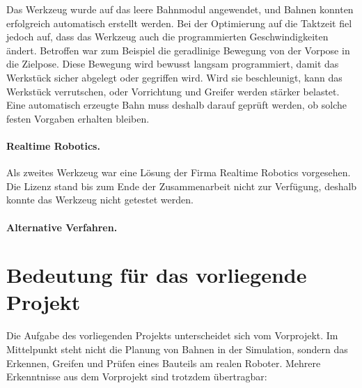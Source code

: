 Das Werkzeug wurde auf das leere Bahnmodul angewendet, und Bahnen konnten erfolgreich
automatisch erstellt werden. Bei der Optimierung auf die Taktzeit fiel jedoch auf, dass das Werkzeug auch
die programmierten Geschwindigkeiten ändert. Betroffen war zum Beispiel die geradlinige Bewegung
von der Vorpose in die Zielpose. Diese Bewegung wird bewusst langsam programmiert, damit das
Werkstück sicher abgelegt oder gegriffen wird. Wird sie beschleunigt, kann das Werkstück
verrutschen, oder Vorrichtung und Greifer werden stärker belastet. Eine automatisch erzeugte
Bahn muss deshalb darauf geprüft werden, ob solche festen Vorgaben erhalten bleiben.


\paragraph{Realtime Robotics.}
Als zweites Werkzeug war eine Lösung der Firma Realtime Robotics vorgesehen. Die Lizenz stand
bis zum Ende der Zusammenarbeit nicht zur Verfügung, deshalb konnte das Werkzeug nicht getestet
werden.

\paragraph{Alternative Verfahren.}

\section{Bedeutung für das vorliegende Projekt}
\label{sec:vp-bedeutung}

Die Aufgabe des vorliegenden Projekts unterscheidet sich vom Vorprojekt. Im Mittelpunkt steht
nicht die Planung von Bahnen in der Simulation, sondern das Erkennen, Greifen und Prüfen eines
Bauteils am realen Roboter. Mehrere Erkenntnisse aus dem Vorprojekt sind trotzdem übertragbar:

